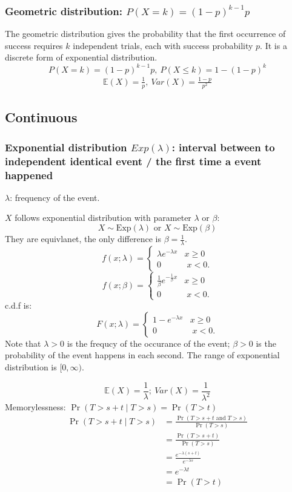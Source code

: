 \documentclass[11pt,a4paper]{article}
\begin{document}
\subsubsection{Geometric distribution: $P(X=k)=(1-p)^{k-1}p$}
The geometric distribution gives the probability that the first occurrence of success requires $k$ independent trials, each with success probability $p$. It is a discrete form of exponential distribution.
$$P(X=k)=(1-p)^{k-1}p,\ P(X\leq k)=1-(1-p)^k$$
\begin{equation}
    \begin{aligned}
        \mathbb{E}(X)=\frac{1}{p},\ Var(X)=\frac{1-p}{p^2}
    \end{aligned}
    \nonumber
\end{equation}

\subsection{Continuous}
\subsubsection{Exponential distribution $Exp(\lambda)$: interval between to independent identical event / the first time a event happened}
$\lambda$: frequency of the event.

$X$ follows exponential distribution with parameter $\lambda$ or $\beta$:
$${\displaystyle X\sim {\text{Exp}}(\lambda )} \text{ or } {\displaystyle X\sim {\text{Exp}}(\beta )}$$
They are equivlanet, the only difference is $\beta=\frac{1}{\lambda}$.
$${f(x;{\lambda})=\left\{{\begin{matrix}{\lambda }e^{-{\lambda }x}&x\geq 0\\0&\;x<0.\end{matrix}}\right.}$$
$${f(x;{\beta})=\left\{{\begin{matrix}{\frac{1}{\beta} }e^{-{\frac{1}{\beta} }x}&x\geq 0\\0&\;x<0.\end{matrix}}\right.}$$
c.d.f is:
$${F(x;{\lambda})=\left\{{\begin{matrix}{1-}e^{-{\lambda }x}&x\geq 0\\0&\;x<0.\end{matrix}}\right.}$$
Note that $\lambda > 0$ is the frequcy of the occurance of the event; $\beta>0$ is the probability of the event happens in each second. The range of exponential distribution is $[0,\infty)$.

$$\mathbb{E}(X)=\frac{1}{\lambda};\ Var(X)=\frac{1}{\lambda^2}$$
Memorylessness: ${\displaystyle \Pr \left(T>s+t\mid T>s\right)=\Pr(T>t)}$
\begin{equation}
    \begin{aligned}
        \Pr (T>s+t\mid T>s)&=\frac{\Pr(T>s+t\text{ and }T>s)}{\Pr(T>s)}\\
        &=\frac{\Pr(T>s+t)}{\Pr(T>s)}\\
        &=\frac{e^{-\lambda(s+t)}}{e^{-\lambda s}}\\
        &=e^{-\lambda t}\\
        &=\Pr (T>t)
    \end{aligned}
    \nonumber
\end{equation}
\end{document}
